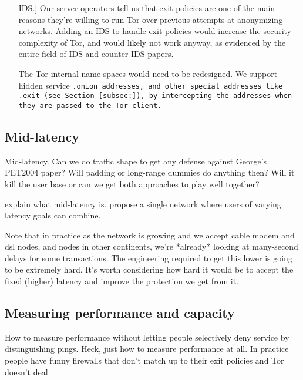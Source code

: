 \documentclass{llncs}
\begin{document}
\begin{enumerate}
IDS.]  Our server operators tell us that exit policies are one of
the main reasons they're willing to run Tor over previous attempts
at anonymizing networks.  Adding an IDS to handle exit policies would
increase the security complexity of Tor, and would likely not work anyway,
as evidenced by the entire field of IDS and counter-IDS papers.
\item [The Tor-internal name spaces would need to be redesigned.] We
support hidden service \tt{.onion} addresses, and other special addresses
like \tt{.exit} (see Section \ref{subsec:}), by intercepting the addresses
when they are passed to the Tor client.
\end{enumerate}

\subsection{Mid-latency}

Mid-latency. Can we do traffic shape to get any defense against George's
PET2004 paper? Will padding or long-range dummies do anything then? Will
it kill the user base or can we get both approaches to play well together?

explain what mid-latency is. propose a single network where users of
varying latency goals can combine.

Note that in practice as the network is growing and we accept cable
modem and dsl nodes, and nodes in other continents, we're *already*
looking at many-second delays for some transactions. The engineering
required to get this lower is going to be extremely hard. It's worth
considering how hard it would be to accept the fixed (higher) latency
and improve the protection we get from it.



\subsection{Measuring performance and capacity}

How to measure performance without letting people selectively deny service
by distinguishing pings. Heck, just how to measure performance at all. In
practice people have funny firewalls that don't match up to their exit
policies and Tor doesn't deal.
\end{document}
